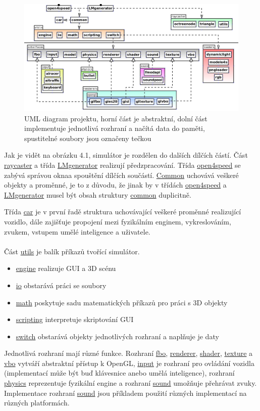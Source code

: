 \documentclass[11pt,twoside,a4paper]{book}
\begin{document}
\begin{figure}[h]
\begin{center}
\includegraphics[width=160mm]{figures/o4suml.png}
\caption{UML diagram projektu, horní část je abstraktní, dolní část implementuje jednotlivá rozhraní a načítá data do paměti, spustitelné soubory jsou označeny tečkou}
\end{center}
\end{figure}
Jak je vidět na obrázku 4.1, simulátor je rozdělen do dalších dílčích částí. Část \ul{raycaster} a třída \ul{LMgenerator} realizují předzpracování. Třída \ul{open4speed} se zabývá správou okna\linebreak a spouštění dílčích součástí. \ul{Common} uchovává veškeré objekty a proměnné, je to z důvodu, že jinak by v třídách \ul{open4speed} a \ul{LMgenerator} musel být obsah struktury \ul{common} duplicitně.

Třída \ul{car} je v první řadě struktura uchovávající veškeré proměnné realizující vozidlo, dále zajišťuje propojení mezi fyzikálním enginem, vykreslováním, zvukem, vstupem umělé inteligence a uživatele.
\\ \\
Část \ul{utils} je balík příkazů tvořící simulátor.
\begin{itemize}
\item \ul{engine} realizuje GUI a 3D scénu
\item \ul{io} obstarává práci se soubory
\item \ul{math} poskytuje sadu matematických příkazů pro práci s 3D objekty
\item \ul{scripting} interpretuje skriptování GUI
\item \ul{switch} obstarává objekty jednotlivých rozhraní a naplňuje je daty
\end{itemize}

Jednotlivá rozhraní mají různé funkce. Rozhraní \ul{fbo}, \ul{renderer}, \ul{shader}, \ul{texture} a \ul{vbo} vytváří abstraktní přístup k OpenGL, \ul{input} je rozhraní pro ovládání vozidla (implementací může být buď klávesnice anebo umělá inteligence), rozhraní \ul{physics} reprezentuje fyzikální engine a rozhraní \ul{sound} umožňuje přehrávat zvuky. Implementace rozhraní \ul{sound} jsou příkladem použití různých implementací na různých platformách.
\end{document}
